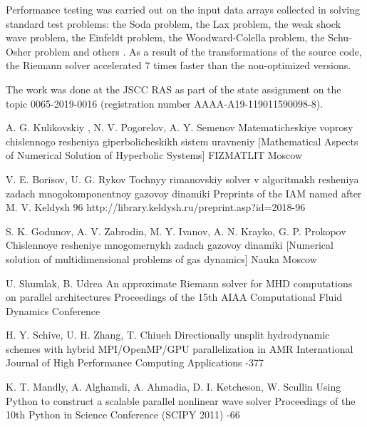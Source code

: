 \documentclass[utf8,english]{psta}%
\begin{document}
Performance testing was carried out on the input data arrays collected in solving standard test problems: the Soda problem, the Lax problem, the weak shock wave problem, the Einfeldt problem, the Woodward-Colella problem, the Schu-Osher problem and others \cite{BulVolTest}.
As a result of the transformations of the source code, the Riemann solver accelerated 7 times faster than the non-optimized versions.

The work was done at the JSCC RAS as part of the state assignment on the topic 0065-2019-0016 (registration number AAAA-A19-119011590098-8). 

\begin{thebibliography}{30}

\by A. G. Kulikovskiy , N. V. Pogorelov, A. Y. Semenov
\book Matematicheskiye voprosy chislennogo resheniya giperbolicheskikh sistem uravneniy [Mathematical Aspects of Numerical Solution of Hyperbolic Systems]
\publ FIZMATLIT
\publaddr Moscow

\by V. E. Borisov, U. G. Rykov
\preprint Tochnyy rimanovskiy solver v algoritmakh resheniya zadach mnogokomponentnoy gazovoy dinamiki
\preprintinfo Preprints of the IAM named after M. V. Keldysh 96
\URL http://library.keldysh.ru/preprint.asp?id=2018-96

\by S. K. Godunov, A. V. Zabrodin, M. Y. Ivanov, A. N. Krayko, G. P. Prokopov
\book Chislennoye resheniye mnogomernykh zadach gazovoy dinamiki [Numerical solution of multidimensional problems of gas dynamics]
\publ Nauka
\publaddr Moscow

\by U. Shumlak, B. Udrea
\paper An approximate Riemann solver for MHD computations on parallel architectures
\jour Proceedings of the 15th AIAA Computational Fluid Dynamics Conference

\by H. Y. Schive, U. H. Zhang, T. Chiueh
\paper Directionally unsplit hydrodynamic schemes with hybrid MPI/OpenMP/GPU parallelization in AMR
\jour International Journal of High Performance Computing Applications
-377

\by K. T. Mandly, A. Alghamdi, A. Ahmadia, D. I. Ketcheson, W. Scullin
\paper Using Python to construct a scalable parallel nonlinear wave solver
\jour Proceedings of the 10th Python in Science Conference (SCIPY 2011)
-66


\end{thebibliography}
\end{document}
